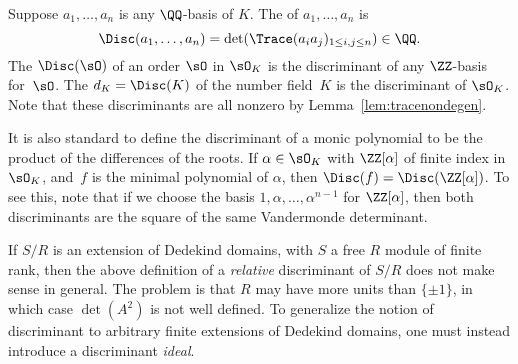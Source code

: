 \begin{definition}[Discriminant]\label{def:disc}
  Suppose $a_1,\ldots, a_n$ is any $\QQ$-basis of $K$.  The 
  of $a_1,\ldots, a_n$ is
  $$
  \Disc(a_1,\ldots,a_n) = \det(\Trace(a_i a_j)_{1\leq i,j\leq n})\in\QQ.
  $$
  The  $\Disc(\sO)$ of an order $\sO$ in $\sO_K$ is
  the discriminant of any $\ZZ$-basis for~$\sO$.
  The  $d_K=\Disc(K)$ of the number field~$K$
  is the discriminant of $\sO_K$.
  Note that these discriminants are all nonzero
  by Lemma~\ref{lem:tracenondegen}.
\end{definition}

\begin{remark}
  It is also standard to define the discriminant of a monic polynomial
  to be the product of the differences of the roots.  If $\alpha\in
  \sO_K$ with $\ZZ[\alpha]$ of finite index in $\sO_K$, and~$f$ is the
  minimal polynomial of $\alpha$, then $\Disc(f)=\Disc(\ZZ[\alpha])$.
  To see this, note that if we choose the basis
  $1,\alpha,\ldots,\alpha^{n-1}$ for $\ZZ[\alpha]$, then both
  discriminants are the square of the same Vandermonde determinant.
\end{remark}



\begin{remark}
  If $S/R$ is an extension of Dedekind domains, with $S$ a free $R$
  module of finite rank, then the above definition of a {\em relative}
  discriminant of $S/R$ does not make sense in general.  The problem
  is that $R$ may have more units than $\{\pm 1\}$, in which case
  $\det(A^2)$ is not well defined.   To generalize the notion of
  discriminant to arbitrary finite extensions of Dedekind domains,
  one must instead introduce a discriminant {\em ideal}.
\end{remark}

